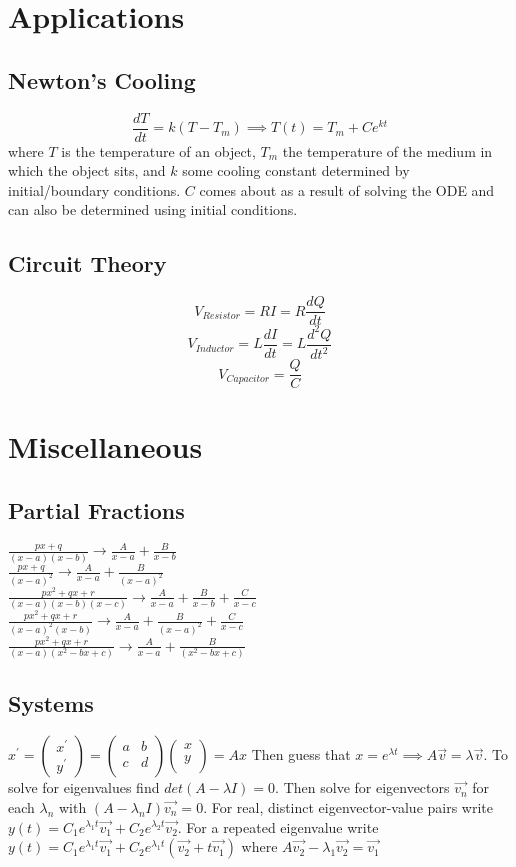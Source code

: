 \documentclass[10pt,landscape,letterpaper]{cheatsheet}
\begin{document}
\section*{Applications}
\subsection*{Newton's Cooling}
$$\frac{dT}{dt}=k(T-T_m)\implies T(t)=T_m+Ce^{kt}$$ where $T$ is the temperature of an object, $T_m$ the temperature of the medium in which the object sits, and $k$ some cooling constant determined by initial/boundary conditions.
$C$ comes about as a result of solving the ODE and can also be determined using initial conditions.
\subsection*{Circuit Theory}
$$V_{Resistor}=RI=R\frac{dQ}{dt}$$
$$V_{Inductor}=L\frac{dI}{dt}=L\frac{d^2Q}{dt^2}$$
$$V_{Capacitor}=\frac{Q}{C}$$
\section*{Miscellaneous}
\subsection*{Partial Fractions}
$\frac{px+q}{(x-a)(x-b)}\to\frac{A}{x-a}+\frac{B}{x-b}$\\
$\frac{px+q}{(x-a)^2}\to\frac{A}{x-a}+\frac{B}{(x-a)^2}$\\
$\frac{px^2+qx+r}{(x-a)(x-b)(x-c)}\to\frac{A}{x-a}+\frac{B}{x-b}+\frac{C}{x-c}$\\
$\frac{px^2+qx+r}{(x-a)^2(x-b)}\to\frac{A}{x-a}+\frac{B}{(x-a)^2}+\frac{C}{x-c}$\\
$\frac{px^2+qx+r}{(x-a)(x^2-bx+c)}\to\frac{A}{x-a}+\frac{B}{(x^2-bx+c)}$
\subsection*{Systems}
$x^\prime=
\begin{pmatrix}
        x^\prime \\
        y^\prime
\end{pmatrix}=
\begin{pmatrix}
        a & b \\
        c & d \\
\end{pmatrix}
\begin{pmatrix}
        x\\
        y\\
\end{pmatrix}=Ax$
Then guess that $x=e^{\lambda t}\implies A\vec{v}=\lambda \vec{v}$.
To solve for eigenvalues find $det\left(A-\lambda I\right)=0$.
Then solve for eigenvectors $\vec{v_n}$ for each $\lambda_n$ with $\left(A-\lambda_n I\right)\vec{v_n}=0$.
For real, distinct eigenvector-value pairs write $y(t)=C_1e^{\lambda_1 t}\vec{v_1}+C_2e^{\lambda_2 t}\vec{v_2}$.
For a repeated eigenvalue write $y(t)=C_1e^{\lambda_1 t}\vec{v_1}+C_2e^{\lambda_1 t}(\vec{v_2}+t\vec{v_1})$ where $A\vec{v_2}-\lambda_1\vec{v_2}=\vec{v_1}$
\end{document}
